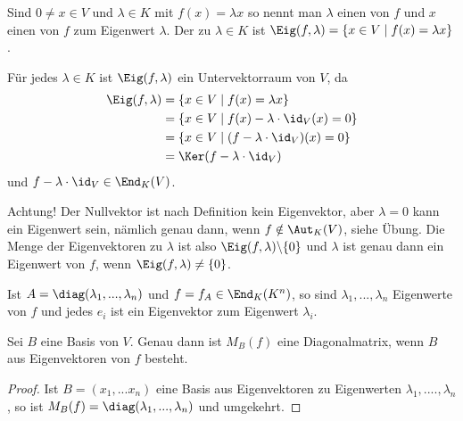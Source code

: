 \begin{definition}
	Sind $0\neq x\in V$ und $\lambda\in K$ mit $f(x)=\lambda x$ so nennt man $\lambda$ einen  von $f$ und $x$ einen  von $f$ zum Eigenwert $\lambda$. Der  zu $\lambda\in K$ ist $\Eig (f,\lambda)=\{x\in V\mid f(x)=\lambda x\}$.
\end{definition}

\begin{remark}
	Für jedes $\lambda\in K$ ist $\Eig (f,\lambda)$ ein Untervektorraum von $V$, da
	\begin{align}
		\Eig (f,\lambda) &= \{x\in V\mid f(x)=\lambda x\} \notag \\
		&= \{x\in V\mid f(x)-\lambda\cdot\id_V(x)=0\} \notag \\
		&= \{x\in V\mid (f-\lambda\cdot\id_V)(x)=0\} \notag \\
		&= \Ker (f-\lambda\cdot\id_V) \notag
	\end{align}
	und $f-\lambda\cdot\id_V\in\End_K(V)$.
\end{remark}

\begin{remark}
	Achtung! Der Nullvektor ist nach Definition kein Eigenvektor, aber $\lambda=0$ kann ein Eigenwert sein, nämlich genau dann, wenn $f\notin\Aut_K(V)$, siehe Übung. Die Menge der Eigenvektoren zu $\lambda$ ist also $\Eig (f,\lambda)\backslash\{0\}$ und $\lambda$ ist genau dann ein Eigenwert von $f$, wenn $\Eig (f,\lambda)\neq\{0\}$.
\end{remark}

\begin{example}
	Ist $A=\diag(\lambda_1,...,\lambda_n)$ und $f=f_A\in\End_K(K^n)$, so sind $\lambda_1,...,\lambda_n$ Eigenwerte von $f$ und jedes $e_i$ ist ein Eigenvektor zum Eigenwert $\lambda_i$.
\end{example}

\begin{proposition}
	Sei $B$ eine Basis von $V$. Genau dann ist $M_B(f)$ eine Diagonalmatrix, wenn $B$ aus Eigenvektoren von $f$ besteht.
\end{proposition}
\begin{proof}
	Ist $B=(x_1,...x_n)$ eine Basis aus Eigenvektoren zu Eigenwerten $\lambda_1,....,\lambda_n$, so ist $M_B(f)= \diag(\lambda_1,...,\lambda_n)$ und umgekehrt.
\end{proof}

